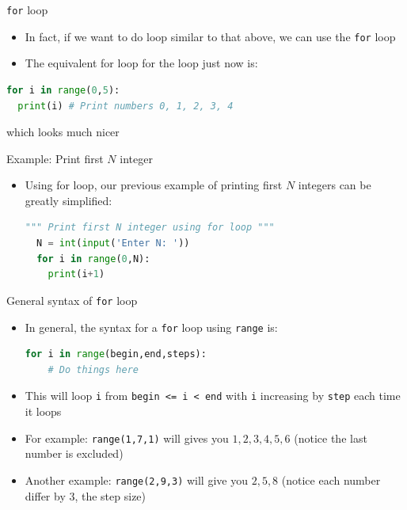 \documentclass[10pt,xcolor={table,dvipsnames},t]{beamer}
\begin{document}
\begin{frame}[fragile]{\texttt{for} loop}
  \begin{itemize}
    \item In fact, if we want to do loop similar to that above, we can use the \texttt{for} loop 
    \item The equivalent for loop for the loop just now is:
  \end{itemize}
\begin{lstlisting}[language=python]
for i in range(0,5):
  print(i) # Print numbers 0, 1, 2, 3, 4 
\end{lstlisting}
which looks much nicer
\end{frame}

\begin{frame}[fragile]{Example: Print first $N$ integer}
  \begin{itemize}
    \item Using for loop, our previous example of printing first $N$ integers can be greatly simplified:
\begin{lstlisting}[language=python]
  """ Print first N integer using for loop """
  N = int(input('Enter N: '))
  for i in range(0,N):
    print(i+1)
\end{lstlisting}
  \end{itemize}
\end{frame}

\begin{frame}[fragile]{General syntax of \texttt{for} loop}
  \begin{itemize}
    \item In general, the syntax for a \texttt{for} loop using \texttt{range} is:
\begin{lstlisting}[language=python]
  for i in range(begin,end,steps):
    # Do things here
\end{lstlisting}
    \item This will loop \texttt{i} from \texttt{begin <= i < end} with \texttt{i} increasing by \texttt{step} each time it loops
    \item For example: \texttt{range(1,7,1)} will gives you ${1,2,3,4,5,6}$ (notice the last number is excluded)
    \item Another example: \texttt{range(2,9,3)} will give you $2,5,8$ (notice each number differ by 3, the step size)
  \end{itemize}
  
\end{frame}
\end{document}
